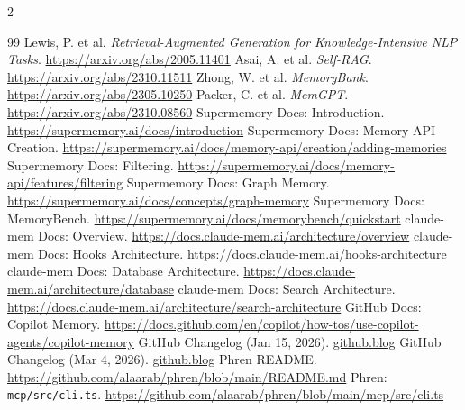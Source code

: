 \documentclass[10pt]{article}
\begin{document}
\vspace{0.5em}
\begin{multicols}{2}
\footnotesize
\setlength{\itemsep}{0pt}
\setlength{\parsep}{0pt}
\setlength{\parskip}{0pt}
\setlength{\topsep}{0pt}
\raggedright
\sloppy
\begin{thebibliography}{99}
\setlength{\itemsep}{0pt}
\setlength{\parsep}{0pt}
 Lewis, P. et al. \textit{Retrieval-Augmented Generation for Knowledge-Intensive NLP Tasks}. \url{https://arxiv.org/abs/2005.11401}
 Asai, A. et al. \textit{Self-RAG}. \url{https://arxiv.org/abs/2310.11511}
 Zhong, W. et al. \textit{MemoryBank}. \url{https://arxiv.org/abs/2305.10250}
 Packer, C. et al. \textit{MemGPT}. \url{https://arxiv.org/abs/2310.08560}
 Supermemory Docs: Introduction. \url{https://supermemory.ai/docs/introduction}
 Supermemory Docs: Memory API Creation. \url{https://supermemory.ai/docs/memory-api/creation/adding-memories}
 Supermemory Docs: Filtering. \url{https://supermemory.ai/docs/memory-api/features/filtering}
 Supermemory Docs: Graph Memory. \url{https://supermemory.ai/docs/concepts/graph-memory}
 Supermemory Docs: MemoryBench. \url{https://supermemory.ai/docs/memorybench/quickstart}
 claude-mem Docs: Overview. \url{https://docs.claude-mem.ai/architecture/overview}
 claude-mem Docs: Hooks Architecture. \url{https://docs.claude-mem.ai/hooks-architecture}
 claude-mem Docs: Database Architecture. \url{https://docs.claude-mem.ai/architecture/database}
 claude-mem Docs: Search Architecture. \url{https://docs.claude-mem.ai/architecture/search-architecture}
 GitHub Docs: Copilot Memory. \url{https://docs.github.com/en/copilot/how-tos/use-copilot-agents/copilot-memory}
 GitHub Changelog (Jan 15, 2026). \href{https://github.blog/changelog/2026-01-15-agentic-memory-for-github-copilot-is-in-public-preview/}{github.blog}
 GitHub Changelog (Mar 4, 2026). \href{https://github.blog/changelog/2026-03-04-copilot-memory-now-on-by-default-for-pro-and-pro-users-in-public-preview/}{github.blog}
 Phren README. \url{https://github.com/alaarab/phren/blob/main/README.md}
 Phren: \texttt{mcp/src/cli.ts}. \url{https://github.com/alaarab/phren/blob/main/mcp/src/cli.ts}

\end{thebibliography}
\end{multicols}
\end{document}

